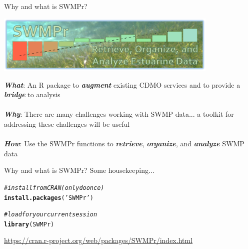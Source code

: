 \documentclass[xcolor=dvipsnames]{beamer}\usepackage[]{graphicx}\usepackage[]{color}
\makeatletter
\newcommand{\hlstr}[1]{\textcolor[rgb]{0.192,0.494,0.8}{#1}}%
\newcommand{\hlcom}[1]{\textcolor[rgb]{0.678,0.584,0.686}{\textit{#1}}}%
\newcommand{\hlstd}[1]{\textcolor[rgb]{0.345,0.345,0.345}{#1}}%
\newcommand{\hlkwd}[1]{\textcolor[rgb]{0.737,0.353,0.396}{\textbf{#1}}}%
\newenvironment{kframe}{%
 \def\at@end@of@kframe{}%
 \ifinner\ifhmode%
  \def\at@end@of@kframe{\end{minipage}}%
  \begin{minipage}{\columnwidth}%
 \fi\fi%
 \def\FrameCommand##1{\hskip\@totalleftmargin \hskip-\fboxsep
 \colorbox{shadecolor}{##1}\hskip-\fboxsep
     \hskip-\linewidth \hskip-\@totalleftmargin \hskip\columnwidth}%
 \MakeFramed {\advance\hsize-\width
   \@totalleftmargin\z@ \linewidth\hsize
   \@setminipage}}%
 {\par\unskip\endMakeFramed%
 \at@end@of@kframe}
\newenvironment{knitrout}{}{} %
\newcommand{\Bigtxt}[1]{\textbf{\textit{#1}}}
\makeatother
\begin{document}
\begin{frame}{Why and what is SWMPr?}
\onslide<+->
\centerline{\includegraphics[width = 0.8\textwidth]{imgs/swmpr_logo.png}}
\vspace{0.2in}
\textbf{\emph{What}}: An R package to \Bigtxt{augment} existing CDMO services and to provide a \Bigtxt{bridge} to analysis\\~\\
\onslide<+->
\Bigtxt{Why}: There are many challenges working with SWMP data... a toolkit for addressing these challenges will be useful \\~\\
\onslide<+->
\Bigtxt{How}: Use the SWMPr functions to \Bigtxt{retrieve}, \Bigtxt{organize}, and \Bigtxt{analyze} SWMP data 
\end{frame}

\begin{frame}[fragile]{Why and what is SWMPr?}
Some housekeeping...
\begin{knitrout}\scriptsize
{}\color{fgcolor}\begin{kframe}
\begin{alltt}
\hlcom{# install from CRAN (only do once)}
\hlkwd{install.packages}\hlstd{(}\hlstr{'SWMPr'}\hlstd{)}

\hlcom{# load for your current session}
\hlkwd{library}\hlstd{(SWMPr)}
\end{alltt}
\end{kframe}
\end{knitrout}
\url{https://cran.r-project.org/web/packages/SWMPr/index.html}
\end{frame}
\end{document}
